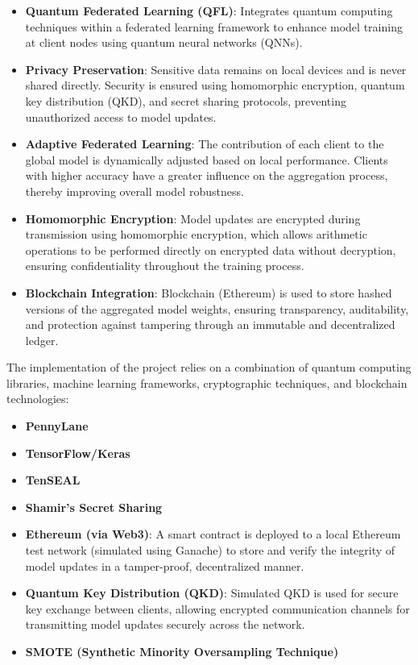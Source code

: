\documentclass[10pt]{article}
\begin{document}
\begin{itemize}
	\item \textbf{Quantum Federated Learning (QFL)}: Integrates quantum computing techniques within a federated learning framework to enhance model training at client nodes using quantum neural networks (QNNs).
	\item \textbf{Privacy Preservation}: Sensitive data remains on local devices and is never shared directly. Security is ensured using homomorphic encryption, quantum key distribution (QKD), and secret sharing protocols, preventing unauthorized access to model updates.
	\item \textbf{Adaptive Federated Learning}: The contribution of each client to the global model is dynamically adjusted based on local performance. Clients with higher accuracy have a greater influence on the aggregation process, thereby improving overall model robustness.
	\item \textbf{Homomorphic Encryption}: Model updates are encrypted during transmission using homomorphic encryption, which allows arithmetic operations to be performed directly on encrypted data without decryption, ensuring confidentiality throughout the training process.
	\item \textbf{Blockchain Integration}: Blockchain (Ethereum) is used to store hashed versions of the aggregated model weights, ensuring transparency, auditability, and protection against tampering through an immutable and decentralized ledger.
\end{itemize}
The implementation of the project relies on a combination of quantum computing libraries, machine learning frameworks, cryptographic techniques, and blockchain technologies:
\begin{itemize}
	\item \textbf{PennyLane}
	\item \textbf{TensorFlow/Keras}
	\item \textbf{TenSEAL}
	\item \textbf{Shamir's Secret Sharing}
	\item \textbf{Ethereum (via Web3)}: A smart contract is deployed to a local Ethereum test network (simulated using Ganache) to store and verify the integrity of model updates in a tamper-proof, decentralized manner.
	\item \textbf{Quantum Key Distribution (QKD)}: Simulated QKD is used for secure key exchange between clients, allowing encrypted communication channels for transmitting model updates securely across the network.
	\item \textbf{SMOTE (Synthetic Minority Oversampling Technique)}
\end{itemize}
\end{document}
